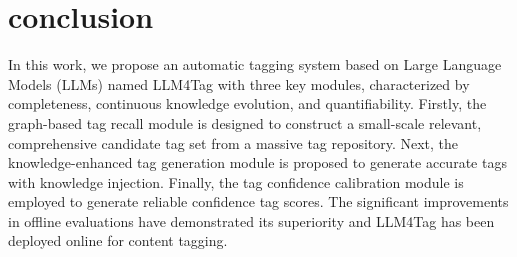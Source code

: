 

\section{conclusion}
In this work, we propose an automatic tagging system based on Large Language Models (LLMs) named LLM4Tag with three key modules, characterized by completeness, continuous knowledge evolution, and quantifiability. Firstly, the graph-based tag recall module is designed to construct a small-scale relevant, comprehensive candidate tag set from a massive tag repository. Next, the knowledge-enhanced tag generation module is proposed to generate accurate tags with knowledge injection. Finally, the tag confidence calibration module is employed to generate reliable confidence tag scores. The significant improvements in offline evaluations have demonstrated its superiority and  LLM4Tag has been deployed online for content tagging.
